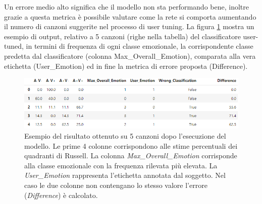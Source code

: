\documentclass[11pt]{report}
\begin{document}
Un errore medio alto significa che il modello non sta performando bene, inoltre grazie a questa metrica è possibile valutare come la rete si comporta aumentando il numero di canzoni suggerite nel processo di user tuning. La figura \ref{fig-output} mostra un esempio di output, relativo a 5 canzoni (righe nella tabella) del classificatore user-tuned, in termini di frequenza di ogni classe emozionale, la corrispondente classe predetta dal classificatore (colonna Max\_Overall\_Emotion), comparata alla vera etichetta (User\_Emotion) ed in fine la metrica di errore proposta (Difference).



\begin{figure}
\centering
\includegraphics[scale = 0.62]{img/example-output.PNG}
\caption{Esempio del risultato ottenuto su 5 canzoni dopo l'esecuzione del modello. Le prime 4 colonne corrispondono alle stime percentuali dei quadranti di Russell. La colonna \textit{Max\_Overall\_Emotion} corrisponde alla classe emozionale con la frequenza rilevata più elevata. La \textit{User\_Emotion} rappresenta l'etichetta annotata dal soggetto. Nel caso le due colonne non contengano lo stesso valore l'errore (\textit{Difference}) è calcolato.}
\label{fig-output}
\end{figure}

\newpage
\end{document}
